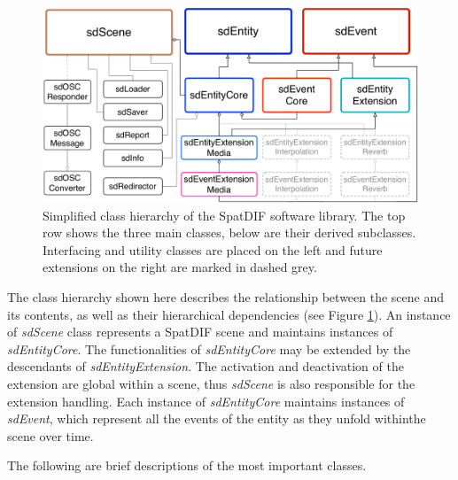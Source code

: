 \documentclass{article}
\begin{document}
\begin{figure}[bh]
	\centering
	\includegraphics[width=\columnwidth]{class_diagram.pdf}
	\caption{Simplified class hierarchy of the SpatDIF software library. The top row shows the three main classes, below are their derived subclasses. Interfacing and utility classes are placed on the left and future extensions on the right are marked in dashed grey.}
	\label{fig:class_structure}

\end{figure}


The class hierarchy shown here describes the relationship between the scene and its contents, as well as their hierarchical dependencies (see Figure \ref{fig:class_structure}). 
An instance of \emph{sdScene} class represents a SpatDIF scene and maintains instances of \emph{sdEntityCore}. The functionalities of \emph{sdEntityCore} may be extended by the descendants of \emph{sdEntityExtension}. 
The activation and deactivation of the extension are global within a scene, thus \emph{sdScene} is also responsible for the extension handling.
Each instance of \emph{sdEntityCore} maintains instances of \emph{sdEvent}, which represent all the events of the entity as they unfold withinthe scene over time.

The following are brief descriptions of the most important classes.
\end{document}
